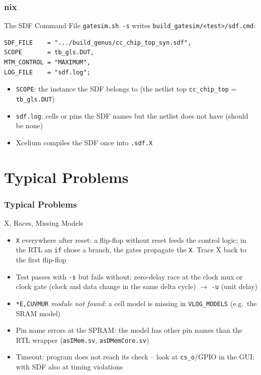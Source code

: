 \documentclass{beamer}
\newcommand{\astitle}{nix}
\newcommand{\assubtitle}{nix}
\newcommand{\cmd}[1]{\texttt{#1}}
\begin{document}
\renewcommand{\assubtitle}{The SDF Command File}
\begin{frame}[fragile]
\frametitle{\astitle}
\begin{block}{\assubtitle}
  \cmd{gatesim.sh -s} writes \cmd{build\_gatesim/<test>/sdf.cmd}:
\begin{lstlisting}
SDF_FILE    = ".../build_genus/cc_chip_top_syn.sdf",
SCOPE       = tb_gls.DUT,
MTM_CONTROL = "MAXIMUM",
LOG_FILE    = "sdf.log";
\end{lstlisting}
  \begin{itemize}
    \item \cmd{SCOPE}: the instance the SDF belongs to (the netlist top
      \cmd{cc\_chip\_top} = \cmd{tb\_gls.DUT})
    \item \cmd{sdf.log}: cells or pins the SDF names but the netlist does not
      have (should be none)
    \item Xcelium compiles the SDF once into \cmd{.sdf.X}
  \end{itemize}
\end{block}
\end{frame}

\section{Typical Problems}
\renewcommand{\astitle}{Typical Problems}

\renewcommand{\assubtitle}{X, Races, Missing Models}
\begin{frame}
\frametitle{\astitle}
\begin{block}{\assubtitle}
  \small
  \begin{itemize}
    \item \cmd{X} everywhere after reset: a flip-flop without reset feeds
      the control logic; in the RTL an \cmd{if} chose a branch, the gates
      propagate the \cmd{X}. Trace X back to the first flip-flop
    \item Test passes with \cmd{-s} but fails without: zero-delay race at
      the clock mux or clock gate (clock and data change in the same
      delta cycle) $\rightarrow$ \cmd{-u} (unit delay)
    \item \cmd{*E,CUVMUR} \emph{module not found}: a cell model is missing
      in \cmd{VLOG\_MODELS} (e.g.\ the SRAM model)
    \item Pin name errors at the SPRAM: the model has other pin names than
      the RTL wrapper (\cmd{asIMem.sv}, \cmd{asDMemCore.sv})
    \item Timeout: program does not reach its check -- look at
      \cmd{cs\_o}/GPIO in the GUI; with SDF also at timing violations
  \end{itemize}
\end{block}
\end{frame}
\end{document}

